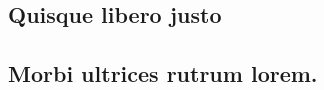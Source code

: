 \documentclass[
	12pt,				%
	openright,			%
	twoside,			%
	a4paper,			%
	english,			%
	brazil				%
	]{abntex2}
\begin{document}
\printbibliography[title=Referências]

%
%

\begin{apendicesenv}

\partapendices
\chapter{Quisque libero justo}
\lipsum[50]

\end{apendicesenv}

\begin{anexosenv}

\partanexos

\chapter{Morbi ultrices rutrum lorem.}
\lipsum[30]
\end{anexosenv}

\printindex
\end{document}
